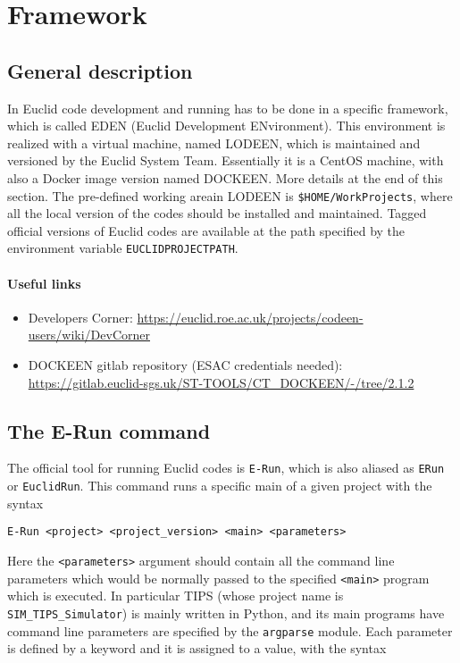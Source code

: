 \section{Framework}
\subsection{General description}
In Euclid code development and running has to be done in a specific framework, which is called EDEN (Euclid Development ENvironment). This environment is realized with a virtual machine, named LODEEN, which is maintained and versioned by the Euclid System Team. Essentially it is a CentOS machine, with also a Docker image version named DOCKEEN. More details at the end of this section.
The pre-defined working areain LODEEN is \verb+$HOME/WorkProjects+, where all the local version of the codes should be installed and maintained. Tagged official versions of Euclid codes are available at the path specified by the environment variable \verb+EUCLIDPROJECTPATH+.

\paragraph{Useful links}
\begin{itemize}
\item Developers Corner: \url{https://euclid.roe.ac.uk/projects/codeen-users/wiki/DevCorner}
\item DOCKEEN gitlab repository (ESAC credentials needed): \url{https://gitlab.euclid-sgs.uk/ST-TOOLS/CT_DOCKEEN/-/tree/2.1.2}
\end{itemize}


\subsection{The E-Run command}
The official tool for running Euclid codes is \verb+E-Run+, which is also aliased as \verb+ERun+ or \verb+EuclidRun+. This command runs a specific main of a given project with the syntax

\begin{verbatim}
E-Run <project> <project_version> <main> <parameters>
\end{verbatim}

Here the \verb+<parameters>+ argument should contain all the command line parameters which would be normally passed to the specified \verb+<main>+ program which is executed. In particular TIPS (whose project name is \verb+SIM_TIPS_Simulator+) is mainly written in Python, and its main programs have command line parameters are specified by the \verb+argparse+ module. Each parameter is defined by a keyword and it is assigned to a value, with the syntax

